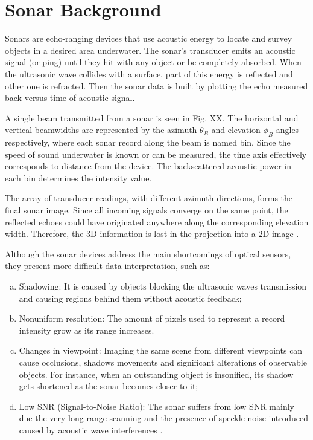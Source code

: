 \documentclass[final,5p,times]{elsarticle}
\begin{document}

\section{Sonar Background}
\label{sonar:background}

Sonars are echo-ranging devices that use acoustic energy to locate and survey objects in a desired area underwater. The sonar's transducer emits an acoustic signal (or ping) until they hit with any object or be completely absorbed. When the ultrasonic wave collides with a surface, part of this energy is reflected and other one is refracted. Then the sonar data is built by plotting the echo measured back versus time of acoustic signal.

A single beam transmitted from a sonar is seen in Fig. XX. The horizontal and vertical beamwidths are represented by the azimuth $\theta_{B}$ and elevation $\phi_{B}$ angles respectively, where each sonar record along the beam is named bin. Since the speed of sound underwater is known or can be measured, the time axis effectively corresponds to distance from the device. The backscattered acoustic power in each bin determines the intensity value.

The array of transducer readings, with different azimuth directions, forms the final sonar image. Since all incoming signals converge on the same point, the reflected echoes could have originated anywhere along the corresponding elevation width. Therefore, the 3D information is lost in the projection into a 2D image \cite{hurtos2014b}.

Although the sonar devices address the main shortcomings of optical sensors, they present more difficult data interpretation, such as:

\begin{enumerate}[(a)]
    \item Shadowing: It is caused by objects blocking the ultrasonic waves transmission and causing regions behind them without acoustic feedback;
    \item Nonuniform resolution: The amount of pixels used to represent a record intensity grow as its range increases.
    \item Changes in viewpoint: Imaging the same scene from different viewpoints can cause occlusions, shadows movements and significant alterations of observable objects. For instance, when an outstanding object is insonified, its shadow gets shortened as the sonar becomes closer to it;
    \item Low SNR (Signal-to-Noise Ratio): The sonar suffers from low SNR mainly due the very-long-range scanning and the presence of speckle noise introduced caused by acoustic wave interferences \cite{abbott1973}.
\end{enumerate}
\end{document}
